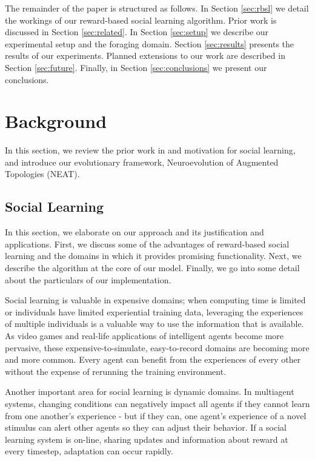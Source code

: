 \documentclass{acm_proc_article-sp}
\begin{document}
The remainder of the paper is structured as follows.
In Section \ref{sec:rbsl} we detail the workings of our reward-based social learning algorithm.
Prior work is discussed in Section \ref{sec:related}.
In Section \ref{sec:setup} we describe our experimental setup and the foraging domain.
Section \ref{sec:results} presents the results of our experiments.
Planned extensions to our work are described in Section \ref{sec:future}. Finally, in Section \ref{sec:conclusions} we present our conclusions.

\section{Background}
\label{sec:background}
In this section, we review the prior work in and motivation for social learning, and introduce our evolutionary framework, Neuroevolution of Augmented Topologies (NEAT).

\subsection*{Social Learning}

In this section, we elaborate on our approach and its justification and applications. First, we discuss some of the advantages of reward-based social learning and the domains in which it provides promising functionality. Next, we describe the algorithm at the core of our model. Finally, we go into some detail about the particulars of our implementation.

Social learning is valuable in expensive domains; when computing time is limited or individuals have limited experiential training data, leveraging the experiences of multiple individuals is a valuable way to use the information that is available. As video games and real-life applications of intelligent agents become more pervasive, these expensive-to-simulate, easy-to-record domains are becoming more and more common. Every agent can benefit from the experiences of every other without the expense of rerunning the training environment.

Another important area for social learning is dynamic domains. In multiagent systems, changing conditions can negatively impact all agents if they cannot learn from one another's experience - but if they can, one agent's experience of a novel stimulus can alert other agents so they can adjust their behavior. If a social learning system is on-line, sharing updates and information about reward at every timestep, adaptation can occur rapidly.
\end{document}
